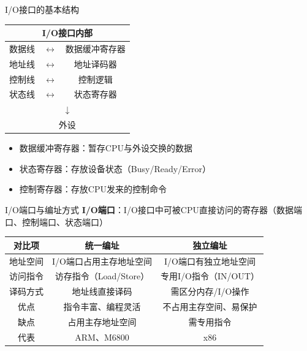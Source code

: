 \documentclass[10pt, aspectratio=169]{beamer}
\begin{document}
\begin{frame}{I/O接口的基本结构}
    \begin{center}
        \begin{tabular}{|c|c|c|}
            \hline
            \multicolumn{3}{|c|}{\textbf{I/O接口内部}} \\
            \hline
            数据线 & $\longleftrightarrow$ & 数据缓冲寄存器 \\
            地址线 & $\longleftrightarrow$ & 地址译码器 \\
            控制线 & $\longleftrightarrow$ & 控制逻辑 \\
            状态线 & $\longleftrightarrow$ & 状态寄存器 \\
            \hline
            \multicolumn{3}{|c|}{$\downarrow$} \\
            \multicolumn{3}{|c|}{外设} \\
            \hline
        \end{tabular}
    \end{center}
    \vspace{0.5em}
    \begin{itemize}
        \item 数据缓冲寄存器：暂存CPU与外设交换的数据
        \item 状态寄存器：存放设备状态（Busy/Ready/Error）
        \item 控制寄存器：存放CPU发来的控制命令
    \end{itemize}
\end{frame}

\begin{frame}{I/O端口与编址方式}
    \textbf{I/O端口}：I/O接口中可被CPU直接访问的寄存器（数据端口、控制端口、状态端口）
    \vspace{0.5em}
    \begin{center}
        \begin{tabular}{|c|c|c|}
            \hline
            \textbf{对比项} & \textbf{统一编址} & \textbf{独立编址} \\
            \hline
            地址空间 & I/O端口占用主存地址空间 & I/O端口有独立地址空间 \\
            访问指令 & 访存指令（Load/Store） & 专用I/O指令（IN/OUT） \\
            译码方式 & 地址线直接译码 & 需区分内存/I/O操作 \\
            优点 & 指令丰富、编程灵活 & 不占用主存空间、易保护 \\
            缺点 & 占用主存地址空间 & 需专用指令 \\
            代表 & ARM、M6800 & x86 \\
            \hline
        \end{tabular}
    \end{center}
\end{frame}
\end{document}
